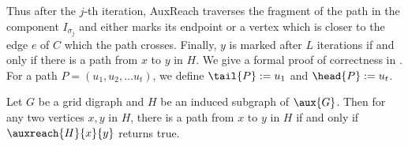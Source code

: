 \documentclass{toc}
\begin{document}
Thus after the $j$-th iteration, \textsf{AuxReach}
%
traverses  %
the fragment of the path in the component $I_{\sigma_j}$ and either
%
marks  %
its endpoint or a vertex which is closer to the edge $e$ of $C$ which the path crosses. Finally, $y$ %
is  %
marked after $L$ iterations if and only if there is a path from $x$ to $y$ in $H$. We give a formal proof of correctness in . For a path $P = (u_1, u_2, \ldots u_t)$, we define $\tail{P} := u_1$ and $\head{P} := u_t$.

\begin{lemma}
\label{lem:algo_correctness}
Let $G$ be a grid %
digraph %
 and $H$ be %
an%
induced subgraph of $\aux{G}$. Then for any two vertices $x,y$ in $H$, there is a path from $x$ to $y$ in $H$ if and only if $\auxreach{H}{x}{y}$ returns \textsf{true}.
\end{lemma}
\end{document}
